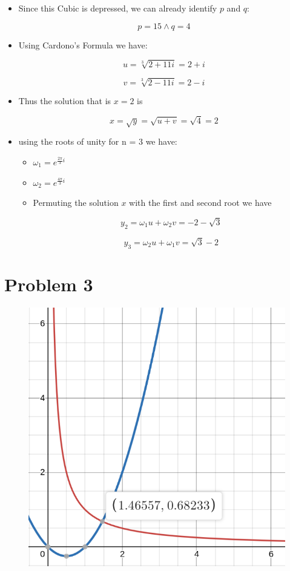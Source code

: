 \documentclass[]{report}
\begin{document}
	
	\begin{itemize}
		\item Since this Cubic is depressed, we can already identify $p$ and $q$:
		
		$$ p = 15 \land q = 4 $$
		
		
		\item Using Cardono's Formula we have:
		
		$$ u = \sqrt[3]{2 + 11i} = 2 + i$$
		
		$$ v = \sqrt[3]{2 - 11i} = 2 - i$$
		
		
		
		\item Thus the solution that is $x = 2$ is
		
		$$ x = \sqrt{y} = \sqrt{u + v } = \sqrt{4} = 2$$
		
		\item using the roots of unity for n = 3 we have:
		
		\begin{itemize}
			\item $\omega_{1} = e^{\frac{2 \pi}{3} i} $
			
			\item $\omega_{2} = e^{\frac{4 \pi}{3} i} $
		\end{itemize}
		
		
		
		\begin{itemize}
			\item Permuting the solution $x$ with the first and second root we have 
			
			$$y_2 = \omega_{1} u + \omega_{2} v = -2 - \sqrt{3}$$
			
			$$y_3 = \omega_{2} u + \omega_{1} v =  \sqrt{3} - 2$$
		\end{itemize}
		
	\end{itemize}
			





\section{Problem 3}
\begin{figure}[H]
	\centering
	\includegraphics[width=0.7\linewidth]{pics/3}
	\caption{}
	\label{fig:3}
\end{figure}
\end{document}
